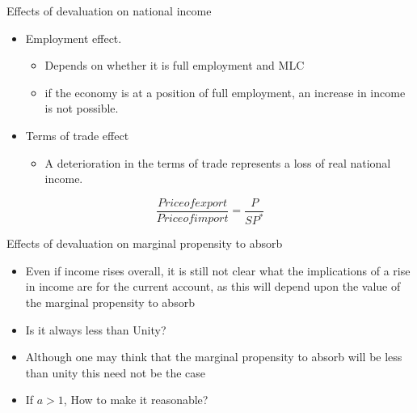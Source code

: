 \documentclass[10pt,hyperref={CJKbookmarks=true},xcolor=dvipsnames,aspectratio=169]{beamer}
\begin{document}
\begin{frame}{Effects of devaluation on national income}

\begin{itemize}
\item Employment effect.

\begin{itemize}
\item Depends on whether it is full employment and MLC
\item if the economy is at a position of full employment, an increase in
income is not possible. 
\end{itemize}
\item Terms of trade effect

\begin{itemize}
\item A deterioration in the terms of trade represents a loss of real national
income.
\end{itemize}
\end{itemize}

\[
\frac{Price of export}{Price of import}=\frac{P}{SP^{*}}
\]



\end{frame}

\begin{frame}{Effects of devaluation on marginal	propensity to absorb}

\begin{itemize}
	\item Even if income rises overall, it is still not clear what the implications of a rise in
	income are for the current account, as this will depend upon the value of the marginal	propensity to absorb
	
	\item Is it always less than Unity?
	\item  Although
	one may think that the marginal propensity to absorb will be less than unity this
	need not be the case
	\item If $a>1$, How to make it reasonable?
	
\end{itemize}
\end{frame}
\end{document}
